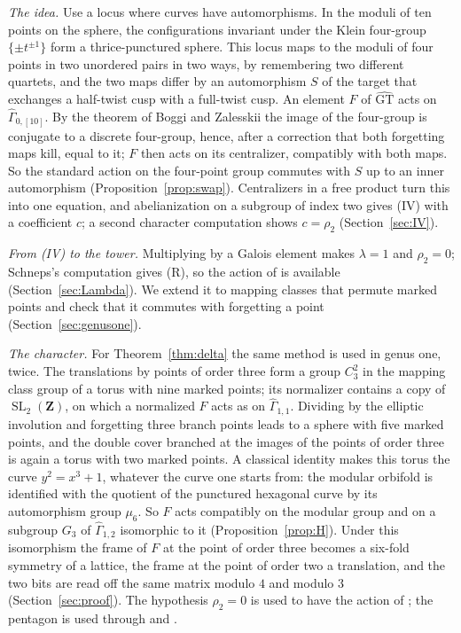 \documentclass[11pt,a4paper]{article}
\theoremstyle{plain}
\theoremstyle{definition}
\theoremstyle{remark}
\newcommand{\GT}{\widehat{\mathrm{GT}}}
\newcommand{\Z}{\mathbf Z}
\newcommand{\Gh}{\widehat\Gamma}
\newcommand{\SL}{\operatorname{SL}}
\begin{document}
\emph{The idea.} Use a locus where curves have automorphisms. In the moduli of ten points on the sphere, the
configurations invariant under the Klein four-group $\{\pm t^{\pm1}\}$ form a thrice-punctured sphere. This locus
maps to the moduli of four points in two unordered pairs in two ways, by remembering two different quartets, and the
two maps differ by an automorphism $S$ of the target that exchanges a half-twist cusp with a full-twist cusp. An
element $F$ of $\GT$ acts on $\Gh_{0,[10]}$. By the theorem of Boggi and Zalesskii the image of the four-group is
conjugate to a discrete four-group, hence, after a correction that both forgetting maps kill, equal to it; $F$ then
acts on its centralizer, compatibly with both maps. So the standard action on the four-point group commutes with
$S$ up to an inner automorphism (Proposition~\ref{prop:swap}). Centralizers in a free product turn this into one
equation, and abelianization on a subgroup of index two gives (IV) with a coefficient $c$; a second character
computation shows $c=\rho_2$ (Section~\ref{sec:IV}).

\emph{From (IV) to the tower.} Multiplying by a Galois element makes $\lambda=1$ and $\rho_2=0$; Schneps's
computation gives (R), so the action of \cite{HLS} is available (Section~\ref{sec:Lambda}). We extend it to mapping
classes that permute marked points and check that it commutes with forgetting a point (Section~\ref{sec:genusone}).

\emph{The character.} For Theorem~\ref{thm:delta} the same method is used in genus one, twice. The translations by
points of order three form a group $C_3^2$ in the mapping class group of a torus with nine marked points; its
normalizer contains a copy of $\SL_2(\Z)$, on which a normalized $F$ acts as on $\Gh_{1,1}$. Dividing by the
elliptic involution and forgetting three branch points leads to a sphere with five marked points, and the double
cover branched at the images of the points of order three is again a torus with two marked points. A classical
identity makes this torus the curve $y^2=x^3+1$, whatever the curve one starts from: the modular orbifold is
identified with the quotient of the punctured hexagonal curve by its automorphism group $\mu_6$. So $F$ acts
compatibly on the modular group and on a subgroup $G_3$ of $\Gh_{1,2}$ isomorphic to it
(Proposition~\ref{prop:H}). Under this isomorphism the frame of $F$ at the point of order three becomes a
six-fold symmetry of a lattice, the frame at the point of order two a translation, and the two bits are read off
the same matrix modulo $4$ and modulo $3$ (Section~\ref{sec:proof}). The hypothesis $\rho_2=0$ is used to have the
action of \cite{HLS}; the pentagon is used through \cite{HLS} and \cite{HMM}.
\end{document}
